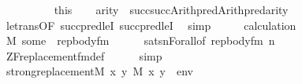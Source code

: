 \begin{isabellebody}
\ \ \isamarkupfalse%
\ {\isacartoucheopen}{\isasymphi}{\isasymin}{\isacharunderscore}{\kern0pt}{\isacartoucheclose}\isanewline
\ \ \isamarkupfalse%
\ \isamarkupfalse%
\ this\isanewline
\ \ \isamarkupfalse%
\ {\isachardoublequoteopen}arity{\isacharparenleft}{\kern0pt}{\isasymphi}{\isacharparenright}{\kern0pt}\ {\isasymle}\ succ{\isacharparenleft}{\kern0pt}succ{\isacharparenleft}{\kern0pt}Arith{\isachardot}{\kern0pt}pred{\isacharparenleft}{\kern0pt}Arith{\isachardot}{\kern0pt}pred{\isacharparenleft}{\kern0pt}arity{\isacharparenleft}{\kern0pt}{\isasymphi}{\isacharparenright}{\kern0pt}{\isacharparenright}{\kern0pt}{\isacharparenright}{\kern0pt}{\isacharparenright}{\kern0pt}{\isacharparenright}{\kern0pt}{\isachardoublequoteclose}\isanewline
\ \ \ \ \isamarkupfalse%
\ le{\isacharunderscore}{\kern0pt}trans{\isacharbrackleft}{\kern0pt}OF\ succpred{\isacharunderscore}{\kern0pt}leI{\isacharbrackright}{\kern0pt}\ succpred{\isacharunderscore}{\kern0pt}leI\ \isamarkupfalse%
\ simp\isanewline
\ \ \isamarkupfalse%
\ \isamarkupfalse%
\ calculation\isanewline
\ \ \isamarkupfalse%
\ {\isachardoublequoteopen}M{\isacharcomma}{\kern0pt}\ some\ {\isasymTurnstile}\ rep{\isacharunderscore}{\kern0pt}body{\isacharunderscore}{\kern0pt}fm{\isacharparenleft}{\kern0pt}{\isasymphi}{\isacharparenright}{\kern0pt}{\isachardoublequoteclose}\isanewline
\ \ \ \ \isamarkupfalse%
\ sats{\isacharunderscore}{\kern0pt}nForall{\isacharbrackleft}{\kern0pt}of\ {\isachardoublequoteopen}rep{\isacharunderscore}{\kern0pt}body{\isacharunderscore}{\kern0pt}fm{\isacharparenleft}{\kern0pt}{\isasymphi}{\isacharparenright}{\kern0pt}{\isachardoublequoteclose}\ {\isacharquery}{\kern0pt}n{\isacharbrackright}{\kern0pt}\isanewline
\ \ \ \ \isamarkupfalse%
\ ZF{\isacharunderscore}{\kern0pt}replacement{\isacharunderscore}{\kern0pt}fm{\isacharunderscore}{\kern0pt}def\isanewline
\ \ \ \ \isamarkupfalse%
\ simp\isanewline
\ \ \isamarkupfalse%
\isanewline
\ \ \isamarkupfalse%
\ {\isachardoublequoteopen}strong{\isacharunderscore}{\kern0pt}replacement{\isacharparenleft}{\kern0pt}{\isacharhash}{\kern0pt}{\isacharhash}{\kern0pt}M{\isacharcomma}{\kern0pt}\ {\isasymlambda}x\ y{\isachardot}{\kern0pt}\ M{\isacharcomma}{\kern0pt}\ {\isacharbrackleft}{\kern0pt}x{\isacharcomma}{\kern0pt}\ y{\isacharbrackright}{\kern0pt}\ {\isacharat}{\kern0pt}\ env\ {\isasymTurnstile}\ {\isasymphi}{\isacharparenright}{\kern0pt}{\isachardoublequoteclose}\isanewline

\end{isabellebody}
